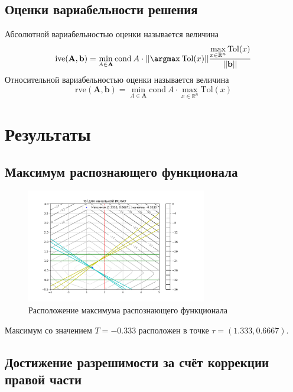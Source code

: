 \documentclass[a4paper,12pt]{article}
\begin{document}
\subsection{Оценки вариабельности решения}
Абсолютной вариабельностью оценки называется величина
\begin{equation}
    \mathrm{ive}(\mathbf{A},\mathbf{b})=\min\limits_{A\in\mathbf{A}}\mathrm{cond}\:A\cdot||\argmax\:\mathrm{Tol}(x)||\frac{\max\limits_{x\in\mathbb{R}^n}\mathrm{Tol}(x)}{||\mathbf{b}||}
\end{equation}
Относительной вариабельностью оценки называется величина
\begin{equation}
    \mathrm{rve}(\mathbf{A},\mathbf{b})=\min\limits_{A\in\mathbf{A}}\mathrm{cond}\:A\cdot\max\limits_{x\in\mathbb{R}^n}\mathrm{Tol}(x)
\end{equation}

\section{Результаты}
\subsection{Максимум распознающего функционала}
\begin{figure}[H]
\centering
\includegraphics[width=0.7\textwidth]{Tol1.png}
\caption{Расположение максимума распознающего функционала} 
\end{figure}
Максимум со значением $T=-0.333$ расположен в точке $\tau=(1.333,0.6667)$.
\subsection{Достижение разрешимости за счёт коррекции правой части}
\end{document}

